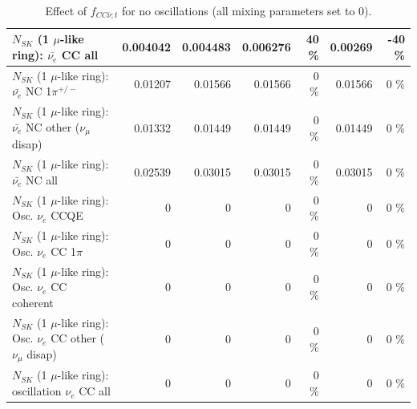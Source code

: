 \begin{table}
\begin{tabular}{| l | r | r | r  r | r  r |}
                            $N_{SK}$ (1 $\mu$-like ring): $\bar{\nu_{e}}$ CC all &        0.004042 &        0.004483 &        0.006276 &       40 \%  &         0.00269 &      -40 \%  \\ 
\hline
                     $N_{SK}$ (1 $\mu$-like ring): $\bar{\nu_e}$ NC 1$\pi^{+/-}$ &         0.01207 &         0.01566 &         0.01566 &        0 \%  &         0.01566 &        0 \%  \\ 
          $N_{SK}$ (1 $\mu$-like ring): $\bar{\nu_e}$ NC other ($\nu_\mu$ disap) &         0.01332 &         0.01449 &         0.01449 &        0 \%  &         0.01449 &        0 \%  \\ 
                            $N_{SK}$ (1 $\mu$-like ring): $\bar{\nu_{e}}$ NC all &         0.02539 &         0.03015 &         0.03015 &        0 \%  &         0.03015 &        0 \%  \\ 
\hline
\hline
\hline
                                 $N_{SK}$ (1 $\mu$-like ring): Osc. $\nu_e$ CCQE &               0 &               0 &               0 &        0 \%  &               0 &        0 \%  \\ 
                            $N_{SK}$ (1 $\mu$-like ring): Osc. $\nu_e$ CC 1$\pi$ &               0 &               0 &               0 &        0 \%  &               0 &        0 \%  \\ 
                          $N_{SK}$ (1 $\mu$-like ring): Osc. $\nu_e$ CC coherent &               0 &               0 &               0 &        0 \%  &               0 &        0 \%  \\ 
           $N_{SK}$ (1 $\mu$-like ring): Osc. $\nu_e$ CC other ($\nu_\mu$ disap) &               0 &               0 &               0 &        0 \%  &               0 &        0 \%  \\ 
                        $N_{SK}$ (1 $\mu$-like ring): oscillation $\nu_e$ CC all &               0 &               0 &               0 &        0 \%  &               0 &        0 \%  \\ 
\hline
\hline
\end{tabular}
\caption{ Effect of $f_{CC\bar{\nu}; t}$ for no oscillations (all mixing parameters set to 0). }
\label{tab:num_xsec_norm_antinutonu_1RmuT_3f_osc_t13:0}
\end{table}
\clearpage
